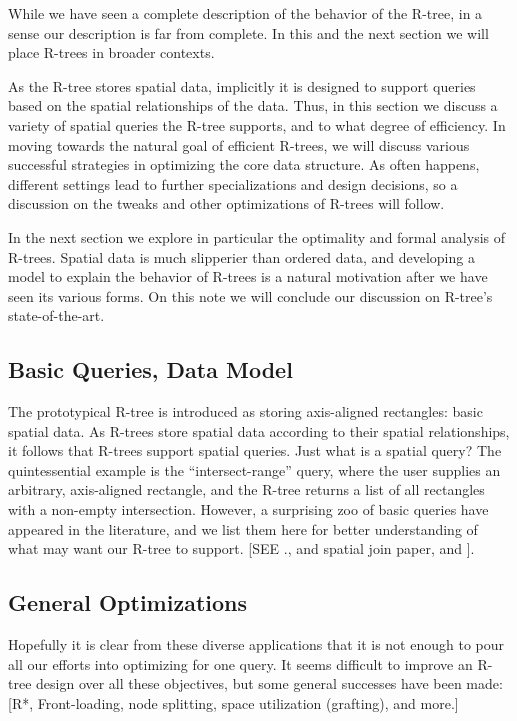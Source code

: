 While we have seen a complete description of the behavior of the R-tree, in a sense our description is far from complete.
In this and the next section we will place R-trees in broader contexts.

As the R-tree stores spatial data, implicitly it is designed to support queries based on the spatial relationships of the data.
Thus, in this section we discuss a variety of spatial queries the R-tree supports, and to what degree of efficiency.
In moving towards the natural goal of efficient R-trees, we will discuss various successful strategies in optimizing the core data structure.
As often happens, different settings lead to further specializations and design decisions, so a discussion on the tweaks and other optimizations of R-trees will follow.

In the next section we explore in particular the optimality and formal analysis of R-trees.
Spatial data is much slipperier than ordered data, and developing a model to explain the behavior of R-trees is a natural motivation after we have seen its various forms.
On this note we will conclude our discussion on R-tree's state-of-the-art.

\subsection{Basic Queries, Data Model}
The prototypical R-tree is introduced as storing axis-aligned rectangles: basic spatial data.
As R-trees store spatial data according to their spatial relationships, it follows that R-trees support spatial queries.
Just what is a spatial query?
The quintessential example is the ``intersect-range'' query, where the user supplies an arbitrary, axis-aligned rectangle, and the R-tree returns a list of all rectangles with a non-empty intersection.
However, a surprising zoo of basic queries have appeared in the literature, and we list them here for better understanding of what may want our R-tree to support.
[SEE \cite{gaedegunther}., and spatial join paper, and \cite{samet95}].

\subsection{General Optimizations}
Hopefully it is clear from these diverse applications that it is not enough to pour all our efforts into optimizing for one query.
It seems difficult to improve an R-tree design over all these objectives, but some general successes have been made:
[R*, Front-loading, node splitting, space utilization (grafting), and more.]

